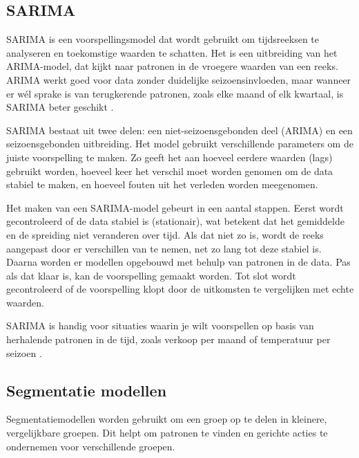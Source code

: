 \subsection*{SARIMA}

SARIMA is een voorspellingsmodel dat wordt gebruikt om tijdsreeksen te analyseren en toekomstige waarden te schatten. Het is een uitbreiding van het ARIMA-model, dat kijkt naar patronen in de vroegere waarden van een reeks. ARIMA werkt goed voor data zonder duidelijke seizoensinvloeden, maar wanneer er wél sprake is van terugkerende patronen, zoals elke maand of elk kwartaal, is SARIMA beter geschikt \autocite{KumarDubey2021}.

\vspace{1em}

SARIMA bestaat uit twee delen: een niet-seizoensgebonden deel (ARIMA) en een seizoensgebonden uitbreiding. Het model gebruikt verschillende parameters om de juiste voorspelling te maken. Zo geeft het aan hoeveel eerdere waarden (lags) gebruikt worden, hoeveel keer het verschil moet worden genomen om de data stabiel te maken, en hoeveel fouten uit het verleden worden meegenomen.

\vspace{1em}

Het maken van een SARIMA-model gebeurt in een aantal stappen. Eerst wordt gecontroleerd of de data stabiel is (stationair), wat betekent dat het gemiddelde en de spreiding niet veranderen over tijd. Als dat niet zo is, wordt de reeks aangepast door er verschillen van te nemen, net zo lang tot deze stabiel is. Daarna worden er modellen opgebouwd met behulp van patronen in de data. Pas als dat klaar is, kan de voorspelling gemaakt worden. Tot slot wordt gecontroleerd of de voorspelling klopt door de uitkomsten te vergelijken met echte waarden.

\vspace{1em}

SARIMA is handig voor situaties waarin je wilt voorspellen op basis van herhalende patronen in de tijd, zoals verkoop per maand of temperatuur per seizoen \autocite{KumarDubey2021}.

\subsection{Segmentatie modellen}

Segmentatiemodellen worden gebruikt om een groep op te delen in kleinere, vergelijkbare groepen. Dit helpt om patronen te vinden en gerichte acties te ondernemen voor verschillende groepen.

